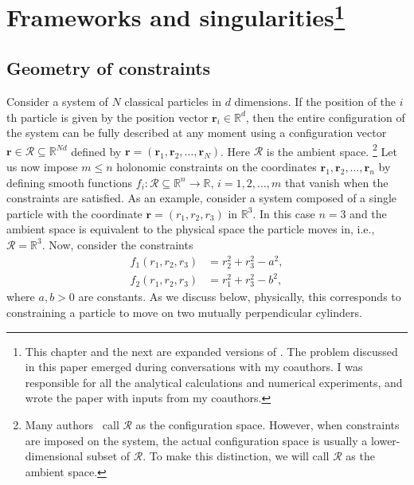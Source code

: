 
\chapter[Frameworks and singularities]{Frameworks and singularities\footnote{%
  This chapter and the next are expanded versions of .
  The problem discussed in this paper emerged during conversations with my coauthors.
  I was responsible for all the analytical calculations and numerical experiments, and wrote the paper with inputs from my coauthors.}}
  \label{chap02}


\section{Geometry of constraints}
\label{sec:constraints}

Consider a system of $N$ classical particles in $d$ dimensions.  If the position of the $i$th particle is given by the position vector $\bm{r}_{i} \in \mathbb{R}^{d}$, then the entire configuration of the system can be fully described at any moment using a configuration vector $\bm{r} \in \mathscr{R} \subseteq \mathbb{R}^{Nd}$ defined by $\bm{r} = (\bm{r}_{1}, \bm{r}_{2}, \ldots, \bm{r}_{N})$.
  Here $\mathscr{R}$ is the ambient space.%
  \footnote{Many authors~\cite{littlejohn1997,lelievre2010} call $\mathscr{R}$ as the configuration space.  However, when constraints are imposed on the system, the actual configuration space is usually a lower-dimensional subset of $\mathscr{R}$.  To make this distinction, we will call $\mathscr{R}$ as the ambient space.}
Let us now impose $m \leq n$ holonomic constraints on the coordinates $\bm{r}_1, \bm{r}_2, \dots, \bm{r}_n$ by defining smooth functions $f_i: \mathscr{R} \subseteq \mathbb{R}^n \to \mathbb{R},\, i=1, 2, \dots, m$ that vanish when the constraints are satisfied.
As an example, consider a system composed of a single particle with the coordinate $\bm{r} = (r_{1}, r_{2}, r_{3})$ in $\mathbb{R}^3$.
In this case $n=3$ and the ambient space is equivalent to the physical space the particle moves in, i.e., $\mathscr{R} = \mathbb{R}^3$.
Now, consider the constraints
%
\begin{equation}
  \begin{aligned}
    f_1(r_{1}, r_{2}, r_{3}) &= r_{2}^{2} + r_{3}^{2} - a^{2},\\
    f_2(r_{1}, r_{2}, r_{3}) &= r_{1}^{2} + r_{3}^{2} - b^{2},
  \end{aligned}
  \label{eq:cylcyl}
\end{equation}
%
where $a, b > 0$ are constants.
As we discuss below, physically, this corresponds to constraining a particle to move on two mutually perpendicular cylinders.

